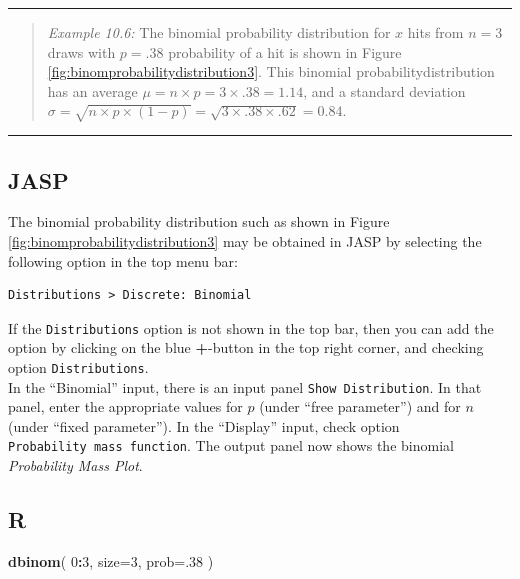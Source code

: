 \documentclass[
]{book}
\newenvironment{Shaded}{\begin{snugshade}}{\end{snugshade}}
\newcommand{\AttributeTok}[1]{\textcolor[rgb]{0.13,0.29,0.53}{#1}}
\newcommand{\DecValTok}[1]{\textcolor[rgb]{0.00,0.00,0.81}{#1}}
\newcommand{\FunctionTok}[1]{\textcolor[rgb]{0.13,0.29,0.53}{\textbf{#1}}}
\newcommand{\NormalTok}[1]{#1}
\newcommand{\SpecialCharTok}[1]{\textcolor[rgb]{0.81,0.36,0.00}{\textbf{#1}}}
\begin{document}
\begin{center}\rule{0.5\linewidth}{0.5pt}\end{center}

\begin{quote}
\emph{Example 10.6:}
The binomial probability distribution for \(x\) hits from \(n=3\) draws with
\(p=.38\) probability of a hit is shown in
Figure \ref{fig:binomprobabilitydistribution3}. This binomial probabilitydistribution has an average \(\mu=n \times p = 3 \times .38 = 1.14\), and a standard deviation
\(\sigma = \sqrt{n \times p \times (1-p)} = \sqrt{ 3 \times .38 \times .62} = 0.84\).
\end{quote}

\begin{center}\rule{0.5\linewidth}{0.5pt}\end{center}

\subsection{JASP}\label{jasp-4}

The binomial probability distribution such as shown in Figure \ref{fig:binomprobabilitydistribution3} may be obtained in JASP by selecting the following option in the top menu bar:

\begin{verbatim}
Distributions > Discrete: Binomial
\end{verbatim}

If the \texttt{Distributions} option is not shown in the top bar, then you can add the option by clicking on the blue \textbf{+}-button in the top right corner, and checking option \texttt{Distributions}.\\
In the ``Binomial'' input, there is an input panel \texttt{Show\ Distribution}. In that panel, enter the appropriate values for \(p\) (under ``free parameter'') and for \(n\) (under ``fixed parameter''). In the ``Display'' input, check option \texttt{Probability\ mass\ function}.
The output panel now shows the binomial \emph{Probability Mass Plot}.

\subsection{R}\label{r-4}

\begin{Shaded}
\begin{Highlighting}[]
\FunctionTok{dbinom}\NormalTok{( }\DecValTok{0}\SpecialCharTok{:}\DecValTok{3}\NormalTok{, }\AttributeTok{size=}\DecValTok{3}\NormalTok{, }\AttributeTok{prob=}\NormalTok{.}\DecValTok{38}\NormalTok{ )}
\end{Highlighting}
\end{Shaded}
\end{document}

